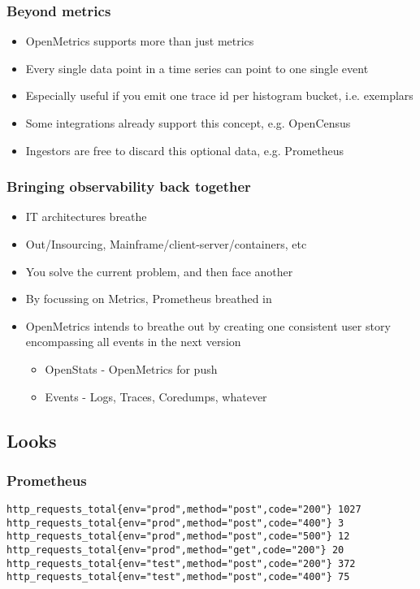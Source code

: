 \documentclass[aspectratio=169]{beamer}
\begin{document}
\begin{frame}
	\frametitle{Beyond metrics}
	\vfill
	\begin{itemize}
		\item OpenMetrics supports more than just metrics
		\item Every single data point in a time series can point to one single event
		\item Especially useful if you emit one trace id per histogram bucket, i.e. exemplars
		\item Some integrations already support this concept, e.g. OpenCensus
		\item Ingestors are free to discard this optional data, e.g. Prometheus
	\end{itemize}
	\vfill
\end{frame}

\begin{frame}
	\frametitle{Bringing observability back together}
	\vfill
	\begin{itemize}
		\item IT architectures breathe
		\item Out/Insourcing, Mainframe/client-server/containers, etc
		\item You solve the current problem, and then face another
		\item By focussing on Metrics, Prometheus breathed in
		\item OpenMetrics intends to breathe out by creating one consistent user story encompassing all events in the next version
		\begin{itemize}
			\item OpenStats - OpenMetrics for push
			\item Events - Logs, Traces, Coredumps, whatever
		\end{itemize}
	\end{itemize}
	\vfill
\end{frame}


\subsection{Looks}

\begin{frame}[fragile]
        \frametitle{Prometheus}
        \fontsize{10pt}{12}\selectfont
        \begin{verbatim}
http_requests_total{env="prod",method="post",code="200"} 1027
http_requests_total{env="prod",method="post",code="400"} 3
http_requests_total{env="prod",method="post",code="500"} 12
http_requests_total{env="prod",method="get",code="200"} 20
http_requests_total{env="test",method="post",code="200"} 372
http_requests_total{env="test",method="post",code="400"} 75
        \end{verbatim}
\end{frame}
\end{document}
